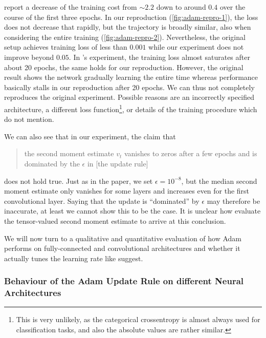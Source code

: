 \citeauthor{kingma2014adam} report a decrease of the training cost from $\sim
2.2$ down to around $0.4$ over the course of the first three epochs. In our
reproduction (\cref{fig:adam-repro-1}), the loss does not decrease that rapidly,
but the trajectory is broadly similar, also when considering the entire training
(\cref{fig:adam-repro-2}). Nevertheless, the original setup achieves training
loss of less than $0.001$ while our experiment does not improve beyond $0.05$.
In \citeauthor{kingma2014adam}'s experiment, the training loss almost saturates
after about 20 epochs, the same holds for our reproduction. However, the
original result shows the network gradually learning the entire time whereas
performance basically stalls in our reproduction after 20 epochs. We can thus
not completely reproduces the original experiment.  Possible reasons are an
incorrectly specified architecture, a different loss function\footnote{This is
    very unlikely, as the categorical crossentropy is almost always used for
classification tasks, and also the absolute values are rather similar.}, or
details of the training procedure which \citeauthor{kingma2014adam} do not
mention.

We can also see that in our experiment, the claim that
\begin{quote}
 the second moment estimate $v_t$ vanishes to zeros after a few epochs and is
 dominated by the $\epsilon$ in [the update rule]
\end{quote}
does not hold true. Just as in the paper, we set $\epsilon = 10^{-8}$, but the
median second moment estimate only vanishes for some layers and increases even
for the first convolutional layer. Saying that the update is ``dominated'' by
$\epsilon$ may therefore be inaccurate, at least we cannot show this to be the
case. It is unclear how \citeauthor{kingma2014adam} evaluate the tensor-valued
second moment estimate to arrive at this conclusion.

We will now turn to a qualitative and quantitative evaluation of how Adam
performs on fully-connected and convolutional architectures and whether it
actually tunes the learning rate like \citet{kingma2014adam} suggest.

\subsubsection{Behaviour of the Adam Update Rule on different Neural
Architectures}
\label{subsec:adam-behaviour}

